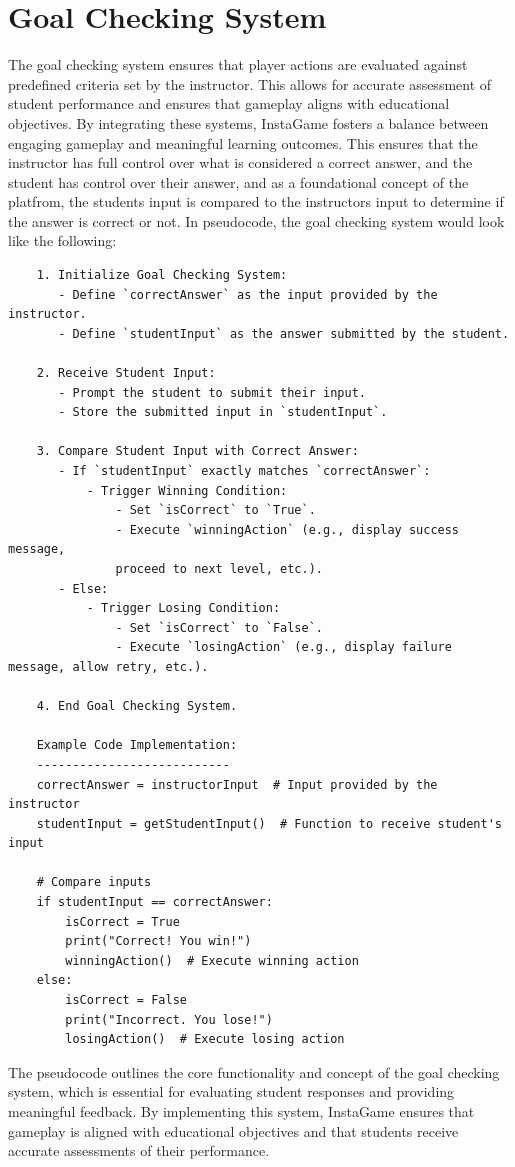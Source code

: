\section{Goal Checking System}
The goal checking system ensures that player actions are evaluated against predefined criteria set by the instructor. This allows for accurate assessment of student performance and ensures that gameplay aligns with educational objectives. By integrating these systems, InstaGame fosters a balance between engaging gameplay and meaningful learning outcomes. This ensures that the instructor has full control over what is considered a correct answer, and the student has control over their answer, and as a foundational concept of the platfrom, the students input is compared to the instructors input to determine if the answer is correct or not. In pseudocode, the goal checking system would look like the following:
\begin{verbatim}
	1. Initialize Goal Checking System:
	   - Define `correctAnswer` as the input provided by the instructor.
	   - Define `studentInput` as the answer submitted by the student.
	
	2. Receive Student Input:
	   - Prompt the student to submit their input.
	   - Store the submitted input in `studentInput`.
	
	3. Compare Student Input with Correct Answer:
	   - If `studentInput` exactly matches `correctAnswer`:
		   - Trigger Winning Condition:
			   - Set `isCorrect` to `True`.
			   - Execute `winningAction` (e.g., display success message, 
			   proceed to next level, etc.).
	   - Else:
		   - Trigger Losing Condition:
			   - Set `isCorrect` to `False`.
			   - Execute `losingAction` (e.g., display failure message, allow retry, etc.).
	
	4. End Goal Checking System.
	
	Example Code Implementation:
	---------------------------
	correctAnswer = instructorInput  # Input provided by the instructor
	studentInput = getStudentInput()  # Function to receive student's input
	
	# Compare inputs
	if studentInput == correctAnswer:
		isCorrect = True
		print("Correct! You win!")
		winningAction()  # Execute winning action
	else:
		isCorrect = False
		print("Incorrect. You lose!")
		losingAction()  # Execute losing action
	\end{verbatim}

The pseudocode outlines the core functionality and concept of the goal checking system, which is essential for evaluating student responses and providing meaningful feedback. By implementing this system, InstaGame ensures that gameplay is aligned with educational objectives and that students receive accurate assessments of their performance.